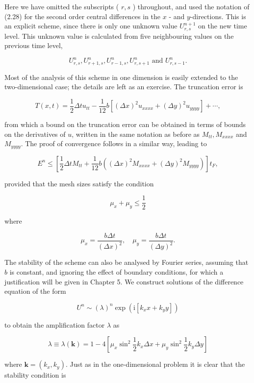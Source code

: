 \documentclass[10pt]{article}
\begin{document}
Here we have omitted the subscripts ( \(r, s\) ) throughout, and used the notation of (2.28) for the second order central differences in the \(x\) - and \(y\)-directions. This is an explicit scheme, since there is only one unknown value \(U_{r, s}^{n+1}\) on the new time level. This unknown value is calculated from five neighbouring values on the previous time level,

\[
U_{r, s}^{n}, U_{r+1, s}^{n}, U_{r-1, s}^{n}, U_{r, s+1}^{n} \text { and } U_{r, s-1}^{n} .
\]

Most of the analysis of this scheme in one dimension is easily extended to the two-dimensional case; the details are left as an exercise. The truncation error is

\[
T(x, t)=\frac{1}{2} \Delta t u_{t t}-\frac{1}{12} b\left[(\Delta x)^{2} u_{x x x x}+(\Delta y)^{2} u_{y y y y}\right]+\cdots,
\]

from which a bound on the truncation error can be obtained in terms of bounds on the derivatives of \(u\), written in the same notation as before as \(M_{t t}, M_{x x x x}\) and \(M_{y y y y}\). The proof of convergence follows in a similar way, leading to

\[
E^{n} \leq\left[\frac{1}{2} \Delta t M_{t t}+\frac{1}{12} b\left((\Delta x)^{2} M_{x x x x}+(\Delta y)^{2} M_{y y y y}\right)\right] t_{F},
\]

provided that the mesh sizes satisfy the condition

\[
\mu_{x}+\mu_{y} \leq \frac{1}{2}
\]

where

\[
\mu_{x}=\frac{b \Delta t}{(\Delta x)^{2}}, \quad \mu_{y}=\frac{b \Delta t}{(\Delta y)^{2}} .
\]

The stability of the scheme can also be analysed by Fourier series, assuming that \(b\) is constant, and ignoring the effect of boundary conditions, for which a justification will be given in Chapter 5. We construct solutions of the difference equation of the form

\[
U^{n} \sim(\lambda)^{n} \exp \left(\mathrm{i}\left[k_{x} x+k_{y} y\right]\right)
\]

to obtain the amplification factor \(\lambda\) as

\[
\lambda \equiv \lambda(\mathbf{k})=1-4\left[\mu_{x} \sin ^{2} \frac{1}{2} k_{x} \Delta x+\mu_{y} \sin ^{2} \frac{1}{2} k_{y} \Delta y\right]
\]

where \(\mathbf{k}=\left(k_{x}, k_{y}\right)\). Just as in the one-dimensional problem it is clear that the stability condition is
\end{document}
